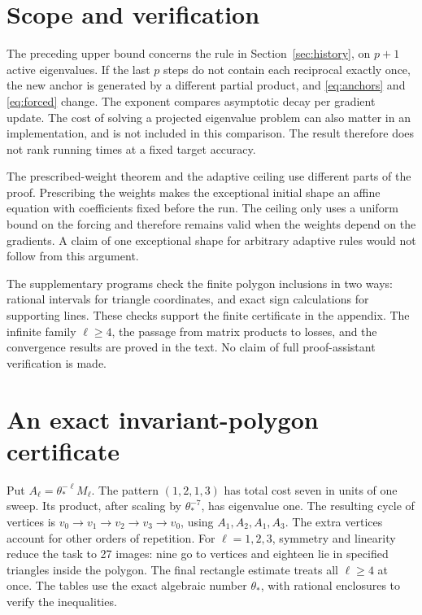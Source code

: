 \documentclass[11pt,a4paper]{article}
\numberwithin{equation}{section}
\begin{document}
\section{Scope and verification}\label{sec:scope}
The preceding upper bound concerns the rule in
Section~\ref{sec:history}, on \(p+1\) active eigenvalues. If the last \(p\) steps do not contain each reciprocal exactly once, the new anchor is generated by a different partial product, and \eqref{eq:anchors} and \eqref{eq:forced} change. The exponent compares asymptotic decay per gradient update.
The cost of solving a projected eigenvalue problem can also matter
in an implementation, and is not included in this comparison.
The result therefore does not rank running times at a fixed target
accuracy.

The prescribed-weight theorem and the adaptive ceiling use different
parts of the proof. Prescribing the weights makes the exceptional
initial shape an affine equation with coefficients fixed before
the run. The ceiling only uses a uniform bound on the forcing and
therefore remains valid when the weights depend on the gradients.
A claim of one exceptional shape for arbitrary adaptive rules would
not follow from this argument.

The supplementary programs check the finite polygon inclusions in
two ways: rational intervals for triangle coordinates, and exact
sign calculations for supporting lines. These checks support the
finite certificate in the appendix. The infinite family
\(\ell\ge4\), the passage from matrix products to losses, and the
convergence results are proved in the text. No claim of full
proof-assistant verification is made.

\appendix
\section{An exact invariant-polygon certificate}\label{app:certificate}

Put \(A_\ell=\theta_*^{-\ell}M_\ell\). The pattern \((1,2,1,3)\) has total cost seven in units of one sweep. Its product, after scaling by \(\theta_*^{-7}\), has eigenvalue one. The resulting cycle of vertices is \(v_0\to v_1\to v_2\to v_3\to v_0\), using \(A_1,A_2,A_1,A_3\). The extra vertices account for other orders of repetition. For \(\ell=1,2,3\), symmetry and linearity reduce the task to 27 images: nine go to vertices and eighteen lie in specified triangles inside the polygon. The final rectangle estimate treats all \(\ell\ge4\) at once. The tables use the exact algebraic number \(\theta_*\), with rational enclosures to verify the inequalities.
\end{document}
